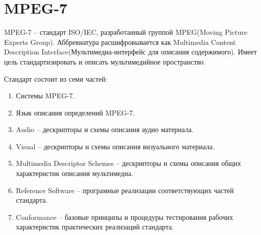 \begin{figure}[ht!]
\end{figure}

\section{ MPEG-7}
MPEG-7 -- стандарт ISO/IEC, разработанный группой MPEG(Moving Picture Experts Group). Аббревиатура расшифровывается как Multimedia Content Description Interface(Мультимедиа-интерфейс для описания содержимого). Имеет цель стандартизировать и описать мультимедийное пространство.

Стандарт состоит из семи частей:
\begin{enumerate}
	\item Системы MPEG-7.
	\item Язык описания определений MPEG-7.
	\item Audio -- дескрипторы и схемы описания аудио материала.
	\item Visual -- дескрипторы и схемы описания визуального материала.
	\item Multimedia Descriptor Schemes -- дескрипторы и схемы описания общих характеристик описания мультимедиа.
	\item Reference Software -- програмные реализации соответствующих частей стандарта.
	\item Conformance -- базовые принципы и процедуры тестирования рабочих характеристик практических реализаций стандарта.
\end{enumerate}

